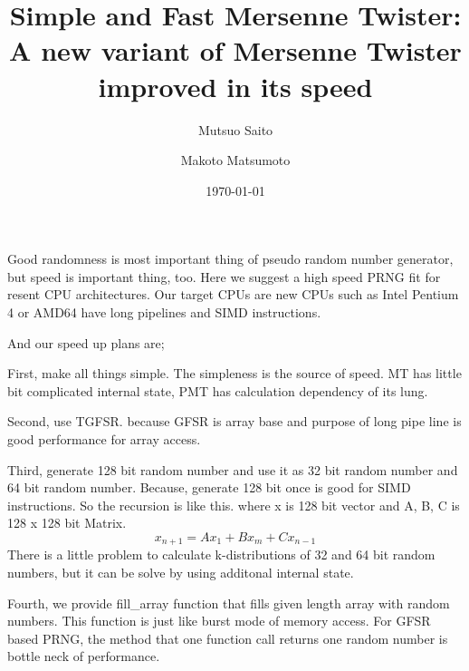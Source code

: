 \documentclass{amsart}
\theoremstyle{definition}
\begin{document}
\title[Simple and Fast MT]
{Simple and Fast Mersenne Twister: A new variant of Mersenne Twister
improved in its speed} 

\author{Mutsuo Saito}
\address{Department of Mathematics \\ Hiroshima University\\
Hiroshima 739-8526, JAPAN}

\author{Makoto Matsumoto}
\address{Department of Mathematics \\ Hiroshima University\\
Hiroshima 739-8526, JAPAN}

\date{\today}


\maketitle

Good randomness is most important thing of pseudo random number
generator, but speed is important thing, too.
Here we suggest a high speed PRNG fit for resent CPU
architectures.
Our target CPUs are new CPUs such as Intel Pentium 4 or AMD64 have
long pipelines and SIMD instructions.

And our speed up plans are;

First, make all things simple. The simpleness is the source of
speed. MT has little bit complicated internal state, PMT has
calculation dependency of its lung.

Second, use TGFSR. because GFSR is array base and 
purpose of long pipe line is good performance for array access.

Third, generate 128 bit random number and use it as 32 bit
random number and 64 bit random number. Because,
generate 128 bit once is good for SIMD instructions.
So the recursion is like this. where x is 128 bit vector and
A, B, C is 128 x 128 bit Matrix.
\[x_{n+1} = Ax_1 + Bx_m + Cx_{n-1}\]
There is a little problem to calculate k-distributions of 32 and
64 bit random numbers, but it can be solve by using additonal 
internal state.

Fourth,  we provide fill\_array function that fills 
given length array with random numbers. This function is
just like burst mode of memory access. For GFSR based PRNG,
the method that one function call returns one random number
is bottle neck of performance.
\end{document}
